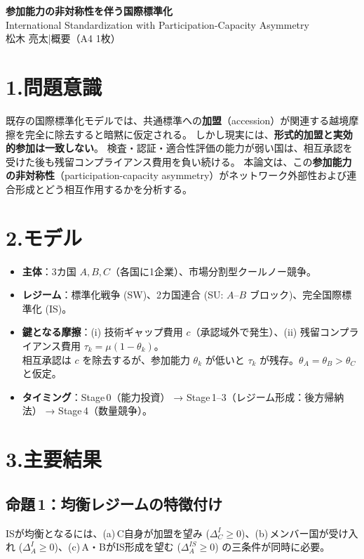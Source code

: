 \documentclass[a4paper,10pt]{article}
\begin{document}
\begin{center}
{\sffamily\bfseries\large\color{navy} 参加能力の非対称性を伴う国際標準化}\\[2pt]
{\small International Standardization with Participation-Capacity Asymmetry}\\[2pt]
{\small 松木 亮太\quad |\quad 概要（A4 1枚）}
\end{center}

\vspace{-2pt}

\section*{1.\;問題意識}
既存の国際標準化モデルでは、共通標準への\textbf{加盟}（accession）が関連する越境摩擦を完全に除去すると暗黙に仮定される。
しかし現実には、\textbf{形式的加盟と実効的参加は一致しない}。
検査・認証・適合性評価の能力が弱い国は、相互承認を受けた後も残留コンプライアンス費用を負い続ける。
本論文は、この\textbf{参加能力の非対称性}（participation-capacity asymmetry）がネットワーク外部性および連合形成とどう相互作用するかを分析する。

\section*{2.\;モデル}
\begin{itemize}[leftmargin=1.2em, itemsep=1pt, topsep=0pt]
  \item \textbf{主体}：3カ国 $A,B,C$（各国に1企業）、市場分割型クールノー競争。
  \item \textbf{レジーム}：標準化戦争 (SW)、2カ国連合 (SU: $A$--$B$ ブロック)、完全国際標準化 (IS)。
  \item \textbf{鍵となる摩擦}：(i) 技術ギャップ費用 $c$（承認域外で発生）、(ii) 残留コンプライアンス費用 $\tau_k=\mu(1-\theta_k)$。\\
    相互承認は $c$ を除去するが、参加能力 $\theta_k$ が低いと $\tau_k$ が残存。\;$\theta_A = \theta_B > \theta_C$ と仮定。
  \item \textbf{タイミング}：Stage\,0（能力投資） → Stage\,1--3（レジーム形成：後方帰納法） → Stage\,4（数量競争）。
\end{itemize}

\section*{3.\;主要結果}

\subsection*{命題\,1：均衡レジームの特徴付け}
ISが均衡となるには、(a)\,C自身が加盟を望み ($\Delta_C^I \ge 0$)、(b)\,メンバー国が受け入れ ($\Delta_A^I \ge 0$)、(c)\,A・BがIS形成を望む ($\Delta_A^{IS}\ge 0$) の三条件が同時に必要。
\end{document}
